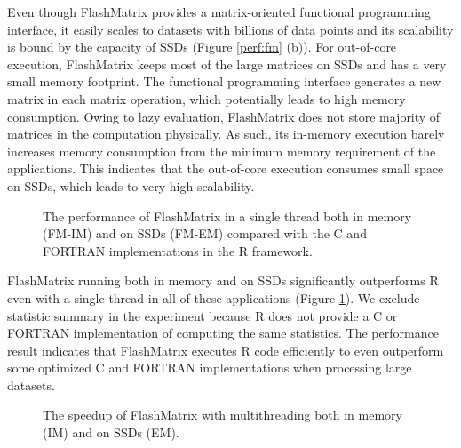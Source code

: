 Even though FlashMatrix provides a matrix-oriented functional programming
interface, it easily scales to datasets with billions of data points and its
scalability is bound by the capacity of SSDs (Figure \ref{perf:fm} (b)).
For out-of-core execution, FlashMatrix keeps most of the large matrices on
SSDs and has a very small memory footprint. The functional programming
interface generates a new matrix in each matrix operation, which potentially
leads to high memory consumption. Owing to lazy evaluation,
FlashMatrix does not store majority of matrices in the computation physically.
As such, its in-memory execution barely increases memory consumption from
the minimum memory requirement of the applications. This indicates that
the out-of-core execution consumes small space on SSDs, which leads to
very high scalability.

\begin{figure}
	\begin{center}
		\footnotesize
		\vspace{-15pt}
		
		\vspace{-10pt}
		\caption{The performance of FlashMatrix in a single thread both in
			memory (FM-IM) and on SSDs (FM-EM) compared with the C and FORTRAN
		implementations in the R framework.}
		\label{fig:fmR}
	\end{center}
\end{figure}

FlashMatrix running both in memory and on SSDs significantly outperforms R
even with a single thread in all of these applications (Figure \ref{fig:fmR}).
We exclude statistic summary in the experiment because R does not provide
a C or FORTRAN implementation of computing the same statistics. The performance
result indicates that FlashMatrix executes R code efficiently to even outperform
some optimized C and FORTRAN implementations when processing large datasets.

\begin{figure}
	\begin{center}
		\footnotesize
		\vspace{-15pt}
		
		\vspace{-10pt}
		\caption{The speedup of FlashMatrix with multithreading both in memory (IM)
		and on SSDs (EM).}
		\label{fig:speedup}
	\end{center}
\end{figure}

